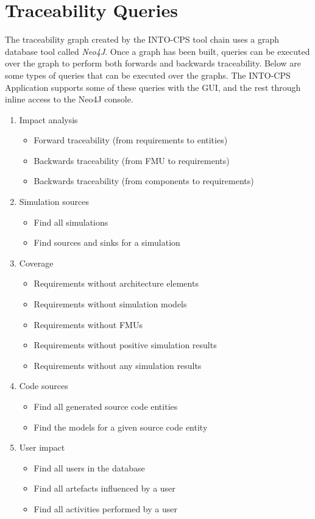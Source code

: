 \section{Traceability Queries}


The traceability graph created by the INTO-CPS tool chain uses a graph database tool called \emph{Neo4J}. Once a graph has been built, queries can be executed over the graph to perform both forwards and backwards traceability. Below are some types of queries that can be executed over the graphs. The INTO-CPS Application supports some of these queries with the GUI, and the rest through inline access to the Neo4J console.

\begin{enumerate}[noitemsep]
  \item Impact analysis
  \begin{itemize}
    \item Forward traceability (from requirements to entities)
    \item Backwards traceability (from FMU to requirements)
    \item Backwards traceability (from components to requirements)
  \end{itemize}
  \item Simulation sources
  \begin{itemize}
    \item Find all simulations
    \item Find sources and sinks for a simulation
  \end{itemize}
  \item Coverage
  \begin{itemize}
    \item Requirements without architecture elements
    \item Requirements without simulation models
    \item Requirements without FMUs
    \item Requirements without positive simulation results
    \item Requirements without any simulation results
  \end{itemize}
  \item Code sources
  \begin{itemize}
    \item Find all generated source code entities
    \item Find the models for a given source code entity
  \end{itemize}
  \item User impact
  \begin{itemize}
    \item Find all users in the database
    \item Find all artefacts influenced by a user
    \item Find all activities performed by a user
  \end{itemize}
\end{enumerate}

